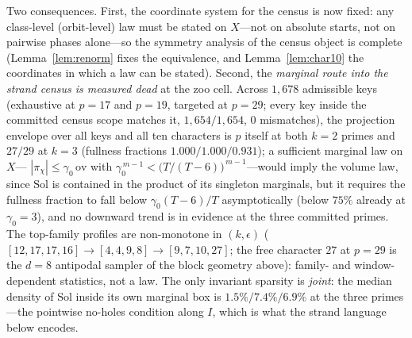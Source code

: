 Two consequences. First, the coordinate system for the census is now
fixed: any class-level (orbit-level) law must be stated on
$X$---not on absolute starts, not on pairwise phases alone---so the
symmetry analysis of the census object is complete
(Lemma~\ref{lem:renorm} fixes the equivalence, and
Lemma~\ref{lem:char10} the coordinates in which a law can be stated).
Second, the \emph{marginal route into the strand census is measured
dead} at the zoo cell. Across $1{,}678$ admissible keys (exhaustive at
$p=17$ and $p=19$, targeted at $p=29$; every key inside the committed
census scope matches it, $1{,}654/1{,}654$, $0$ mismatches), the
projection envelope over all keys and all ten characters is $p$ itself
at both $k=2$ primes and $27/29$ at $k=3$ (fullness fractions
$1.000/1.000/0.931$); a sufficient marginal law on $X$---
$|\pi_\chi|\le\gamma_0\,\mathrm{ov}$ with
$\gamma_0^{\,m-1}<\bigl(T/(T-6)\bigr)^{\,m-1}$---would imply the
volume law, since $\mathrm{Sol}$ is contained in the product of its
singleton marginals, but it requires the fullness fraction to fall
below $\gamma_0(T-6)/T$ asymptotically (below $75\%$ already at
$\gamma_0=3$), and no downward trend is in evidence at the three
committed primes. The top-family profiles are non-monotone in
$(k,\epsilon)$ ($[12,17,17,16]\to[4,4,9,8]\to[9,7,10,27]$; the free
character $27$ at $p=29$ is the $d=8$ antipodal sampler of the block
geometry above): family- and window-dependent statistics, not a law.
The only invariant sparsity is \emph{joint}: the median density of
$\mathrm{Sol}$ inside its own marginal box is $1.5\%/7.4\%/6.9\%$ at
the three primes---the pointwise no-holes condition along $I$, which
is what the strand language below encodes.

